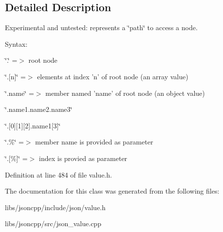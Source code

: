 \subsection{Detailed Description}
Experimental and untested\-: represents a \char`\"{}path\char`\"{} to access a node. 

Syntax\-:
\begin{DoxyItemize}
\item \char`\"{}.\char`\"{} =$>$ root node
\item \char`\"{}.\mbox{[}n\mbox{]}\char`\"{} =$>$ elements at index 'n' of root node (an array value)
\item \char`\"{}.\-name\char`\"{} =$>$ member named 'name' of root node (an object value)
\item \char`\"{}.\-name1.\-name2.\-name3\char`\"{}
\item \char`\"{}.\mbox{[}0\mbox{]}\mbox{[}1\mbox{]}\mbox{[}2\mbox{]}.\-name1\mbox{[}3\mbox{]}\char`\"{}
\item \char`\"{}.\%\char`\"{} =$>$ member name is provided as parameter
\item \char`\"{}.\mbox{[}\%\mbox{]}\char`\"{} =$>$ index is provied as parameter 
\end{DoxyItemize}

Definition at line 484 of file value.\-h.



The documentation for this class was generated from the following files\-:\begin{DoxyCompactItemize}
\item 
libs/jsoncpp/include/json/value.\-h\item 
libs/jsoncpp/src/json\-\_\-value.\-cpp\end{DoxyCompactItemize}
